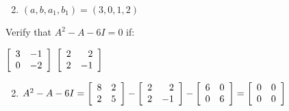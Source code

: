 \begin{multicols}{2}
\begin{ex}
\begin{enumerate}[label={\alph*.}]
\end{enumerate}
\begin{sol}
\begin{enumerate}[label={\alph*.}]
\setcounter{enumi}{1}
\item  $(a, b, a_{1}, b_{1}) = (3, 0, 1, 2)$

\end{enumerate}
\end{sol}
\end{ex}

\begin{ex}
Verify that $A^{2} - A - 6I = 0$ if:
\begin{exenumerate}
\exitem 
$ \left[ \begin{array}{rr}
3 & -1 \\
0 & -2
\end{array} \right]
$
\exitem 
$ \left[ \begin{array}{rr}
2 & 2 \\
2 & -1
\end{array} \right]
$
\end{exenumerate}
\begin{sol}
\begin{enumerate}[label={\alph*.}]
\setcounter{enumi}{1}
\item
$A^{2} - A - 6I = \left[ \begin{array}{rr}
8 & 2 \\
2 & 5
\end{array} \right] - \left[ \begin{array}{rr}
2 & 2 \\
2 & -1
\end{array} \right] - \left[ \begin{array}{rr}
6 & 0 \\
0 & 6
\end{array} \right] = \left[ \begin{array}{rr}
0 & 0 \\
0 & 0
\end{array} \right]$

\end{enumerate}
\end{sol}
\end{ex}

\begin{ex}\label{ex:ex2_3_5}


\end{ex}
\end{multicols}

